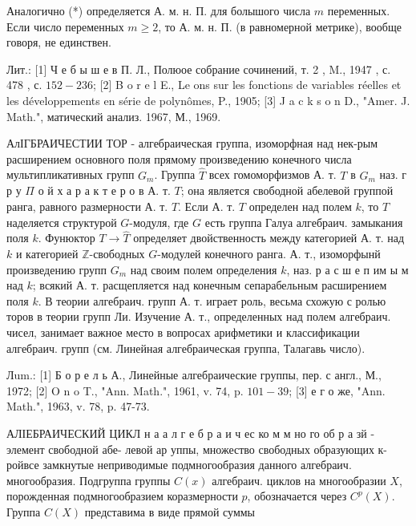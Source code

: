\documentclass[10pt]{article}
\begin{document}
Аналогично (*) определяется А. м. н. П. для болышого числа $m$ переменных. Если число переменных $m \geqslant 2$, то А. м. н. П. (в равномерной метрике), вообще говоря, не единствен.



Лит.: [1] Ч е б ы ш е в П. Л., Полюое собрание сочинений, т. 2 , M., 1947 , с. 478 , с. $152-236$; [2] B o r e l E., Le ons sur les fonctions de variables réelles et les développements en série de polynômes, P., 1905; [3] J a c k s o n D., "Amer. J. Math.", матический анализ. 1967, М., 1969.



АлІГБРАИЧЕСТИИ ТОР - алгебраическая группа, изоморфная над нек-рым расширением основного поля прямому произведению конечного числа мультипликативных групп $G_{m}$. Группа $\hat{T}$ всех гомоморфизмов А. т. $T$ в $G_{m}$ наз. г р у $\Pi$ о й х а р а к т е р о в А. т. $T$; она является свободной абелевой группой ранга, равного размерности А. т. $T$. Если А. т. $T$ определен над полем $k$, то $\widehat{T}$ наделяется структурой $G$-модуля, где $G$ есть группа Галуа алгебраич. замыкания поля $k$. Фунюктор $T \rightarrow \widehat{T}$ определяет двойственность между категорией А. т. над $k$ и категорией $\mathbb{Z}$-свободных $G$-модулей конечного ранга. А. т., изоморфынй произведению групп $G_{m}$ над своим полем определения $k$, наз. р а с ш е п им ы м над $k$; всякий А. т. расщепляется над конечным сепарабельным расширением поля $k$. В теории алгебраич. групп А. т. играет роль, весьма схожую с ролью торов в теории групп Ли. Изучение А. т., определенных над полем алгебраич. чисел, занимает важное место в вопросах арифметики и классификации алгебраич. групп (см. Линейная алгебраическая группа, Талагавь число).



Лum.: [1] Б о р е л ь А., Линейные алгебраические группы, пер. с англ., М., 1972; [2] O n o T., "Ann. Math.", 1961, v. 74, p. $101-39$; [3] е г о же, "Ann. Math.", 1963, v. 78, p. 47-73.



АЛІЕБРАИЧЕСКИЙ ЦИКЛ н а а л г е б р а и ч ес ко м м но го об р а зй - элемент свободной абе- левой ар уппы, множество свободных образующих к-ройвсе замкнутые неприводимые подмногообразия данного алгебраич. многообразия. Подгруппа группы $C(x)$ алгебраич. циклов на многообразии $X$, порожденная подмногообразием коразмерности $p$, обозначается через $C^{p}(X)$. Группа $C(X)$ представима в виде прямой суммы
\end{document}
